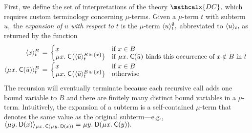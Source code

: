 \documentclass[smallcondensed,draft]{svjour3}
\newcommand\MU{\vvthinspace\mu\vvthinspace}
\newcommand\const[1]{\textsf{#1}}
\renewcommand{\vec}[1]{\bar #1}
\newcommand{\expand}[2]{\langle \smash{#2} \rangle_{#1}}
\newcommand{\thD}{\mathcalx{DC}}
\newcommand\vvthinspace{\kern+0.041667em}
\begin{document}
First, we define the set of interpretations of the theory $\thD,$
which requires custom terminology concerning $\mu$-terms.
Given a $\mu$-term $t$ with subterm $u,$
the \emph{expansion of $u$ with respect to $t$} is the $\mu$-term $\expand{t}{u}^\emptyset,$
abbreviated to
$\expand{t}{u},$ as returned by the function
\[\begin{array}{@{}r@{}c@{}l@{}}
\expand{t}{x}^B & {} \,=\, {} &
\textstyle\relax{\begin{cases}
    x & \text{if $x \in B$}   \\[-\jot]
    \MU x.\; \const{C}\smash{\bigl( \expand{t}{ \vec u}^{\smash{B \,\uplus\, \{ x \}}}\bigr)} & \text{if
    $\MU x.\; \const{C}( \vec u )$ binds this occurrence of $x \notin B$ in $t$}
\end{cases}} ~ \\
\expand{t}{\MU x.\; \const{C}( \vec u )}^B & = &
\textstyle\begin{cases}
    x & \text{if $x \in B$} \\[-\jot]
    \MU x.\; \const{C}\smash{\bigl( \expand{t}{ \vec u }^{\smash{B \,\uplus\, \{ x \}}}\bigr)} & \text{otherwise}
\end{cases}
\end{array}\]
The recursion will eventually terminate because each recursive call adds one bound
variable to $B$ and there are finitely many distinct bound variables in a $\mu$-term.
Intuitively, the expansion of a subterm is a self-contained
$\mu$-term that denotes the same value as the original subterm---\allowbreak e.g.,
$\expand{\MU x.\: \const{C}(\MU y.\: \const{D}(x))}{\MU y.\: \const{D}(x)} =
 \MU y.\: \const{D}(\MU x.\: \const{C}(y)).$
%
\end{document}
